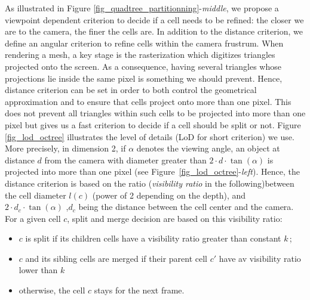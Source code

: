 \documentclass{llncs}
\begin{document}
As illustrated in Figure
\ref{fig_quadtree_partitionning}-\emph{middle}, we propose a viewpoint
dependent criterion to decide if a cell needs to be refined: the
closer we are to the camera, the finer the cells are. In addition to
the distance criterion, we define an angular criterion to refine cells
within the camera frustrum. When rendering a mesh, a key stage is the
rasterization which digitizes triangles projected onto the
screen. As a consequence, having several triangles whose projections
lie inside the same pixel is something we should prevent. Hence,
distance criterion can be set in order to both control the geometrical
approximation and to ensure that cells project onto more than one
pixel. This does not prevent all triangles within such cells to be
projected into more than one pixel but gives us a fast criterion to
decide if a cell should be split or not.  Figure \ref{fig_lod_octree}
illustrates the level of details (LoD for short criterion) we
use. More precisely, in dimension 2, if $\alpha$ denotes the viewing
angle, an object at distance $d$ from the camera with diameter greater than
 $2\cdot d\cdot\tan(\alpha)$
 is projected into more than one pixel
(see Figure~\ref{fig_lod_octree}-\emph{left}). Hence, the distance
criterion is based on the ratio (\emph{visibility ratio} in the
following)between the cell diameter $l(c)$ (power of 2 depending on
the depth), and
$2\cdot d_c\cdot\tan(\alpha)$ 
,$d_c$ being the distance between the cell center and the camera. For a given cell $c$,
split and merge decision are based on this visibility ratio:
\begin{itemize}
\item $c$ is split if its children cells have a visibility ratio
  greater than  constant $k$\,;
\item $c$ and its sibling cells are merged if their parent cell $c'$
  have av visibility ratio lower than $k$\;
\item otherwise, the cell $c$ stays for the next frame.
\end{itemize}
%
\end{document}
